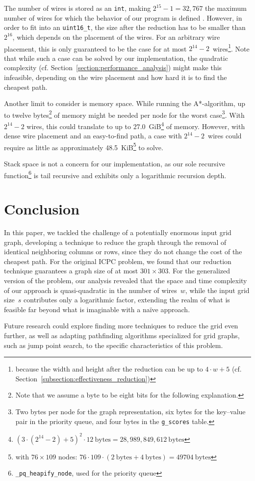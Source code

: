 \documentclass[sigconf,nonacm,screen]{acmart}
\begin{document}
The number of wires is stored as an \texttt{int}, making $2^{15}-1=32,767$ the maximum number of wires for which the behavior of our program is defined \cite{isoiec_C99}. However, in order to fit into an \texttt{uint16\_t}, the size after the reduction has to be smaller than $2^{16}$, which depends on the placement of the wires. For an arbitrary wire placement, this is only guaranteed to be the case for at most $2^{14}-2$~wires\footnote{because the width and height after the reduction can be up to $4\cdot w + 5$ (cf. Section~\ref{subsection:effectiveness_reduction})}. Note that while such a case can be solved by our implementation, the quadratic complexity (cf. Section~\ref{section:performance_analysis}) might make this infeasible, depending on the wire placement and how hard it is to find the cheapest path.

Another limit to consider is memory space. While running the A*-algorithm, up to twelve bytes\footnote{Note that we assume a byte to be eight bits for the following explanation.} of memory might be needed per node for the worst case\footnote{Two bytes per node for the graph representation, six bytes for the key--value pair in the priority queue, and four bytes in the \texttt{g\_scores} table.}. With $2^{14}-2$ wires, this could translate to up to $27.0$~GiB\footnote{$(3\cdot(2^{14}-2)+5)^2\cdot12 \mathrm{~bytes} = 28,989,849,612 \mathrm{~bytes}$} of memory. However, with dense wire placement and an easy-to-find path, a case with $2^{14}-2$~wires could require as little as approximately 48.5~KiB\footnote{with $76\times109$ nodes: $76\cdot109\cdot(2~\mathrm{bytes}+4~\mathrm{bytes})= 49704~\mathrm{bytes}$} to solve.

Stack space is not a concern for our implementation, as our sole recursive function\footnote{\texttt{\_pq\_heapify\_node}, used for the priority queue} is tail recursive and exhibits only a logarithmic recursion depth.



\section{Conclusion}
In this paper, we tackled the challenge of a potentially enormous input grid graph, developing a technique to reduce the graph through the removal of identical neighboring columns or rows, since they do not change the cost of the cheapest path. For the original ICPC problem, we found that our reduction technique guarantees a graph size of at most $301\times303$. For the generalized version of the problem, our analysis revealed that the space and time complexity of our approach is quasi-quadratic in the number of wires~$w$, while the input grid size~$s$ contributes only a logarithmic factor, extending the realm of what is feasible far beyond what is imaginable with a na\"ive approach.

Future research could explore finding more techniques to reduce the grid even further, as well as adapting pathfinding algorithms specialized for grid graphs, such as jump point search, to the specific characteristics of this problem.




\end{document}
